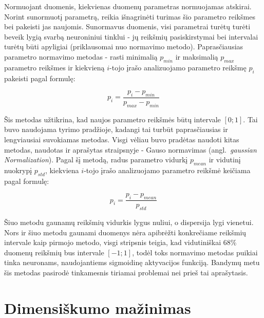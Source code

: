 \documentclass{VUMIFPSbakalaurinis}
\begin{document}
Normuojant duomenis, kiekvienas duomenų parametras normuojamas atskirai.
Norint sunormuotį parametrą, reikia išnagrinėti turimas šio parametro reikšmes bei pakeisti jas naujomis.
Sunormavus duomenis, visi parametrai turėtų turėti beveik lygią svarbą neuroniniui tinklui - jų reikšmių pasiskirstymai bei intervalai turėtų būti apyligiai (priklausomai nuo normavimo metodo).
Paprasčiausias parametro normavimo metodas - rasti minimalią $p_{min}$ ir maksimalią $p_{max}$ parametro reikšmes ir kiekvieną $i$-tojo įrašo analizuojamo parametro reikšmę $p_i$ pakeisti pagal formulę:

\begin{equation}
p_i = \frac{p_i - p_{min}}{p_{max} - p_{min}}
\end{equation}

Šis metodas užtikrina, kad naujos parametro reikšmės būtų intervale $[0; 1]$.
Tai buvo naudojama tyrimo pradžioje, kadangi tai turbūt paprasčiausias ir lengviausiai suvokiamas metodas.
Visgi vėliau buvo pradėtas naudoti kitas metodas, naudotas ir aprašytas \cite[817~psl.]{gaussian} straipsnyje - Gauso normavimas (angl.~\textit{gaussian Normalization}).
Pagal šį metodą, radus parametro vidurkį $p_{mean}$ ir vidutinį nuokrypį $p_{std}$, kiekviena $i$-tojo įrašo analizuojamo parametro reikšmė keičiama pagal formulę:

\begin{equation}
p_i = \frac{p_i - p_{mean}}{p_{std}}
\end{equation}

Šiuo metodu gaunamų reikšmių vidurkis lygus nuliui, o dispersija lygi vienetui.
Nors ir šiuo metodu gaunami duomenys nėra apibrėžti konkrečiame reikšmių intervale kaip pirmojo metodo, visgi \cite[817~psl.]{gaussian} stripsnis teigia, kad vidutiniškai 68\% duomenų reikšmių bus intervale $[-1; 1]$, todėl toks normavimo metodas puikiai tinka neuronams, naudojantiems sigmoidinę aktyvacijos funkciją.
Bandymų metu šis metodas pasirodė tinkamesnis tiriamai problemai nei prieš tai aprašytasis.



\section{Dimensiškumo mažinimas}
\end{document}
